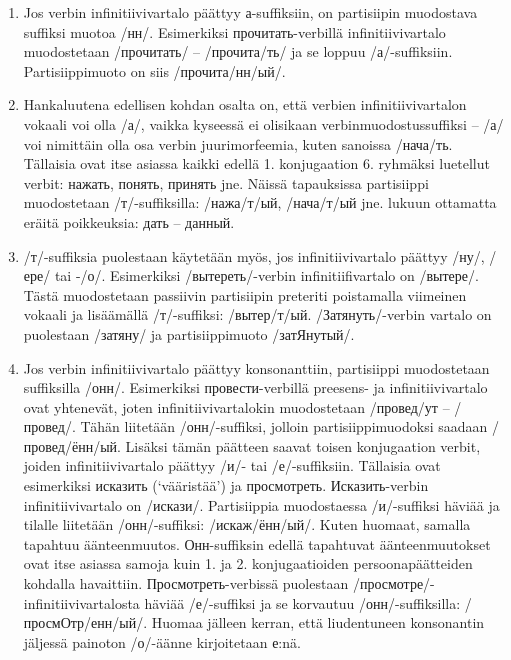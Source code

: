 \documentclass[]{scrreprt}
\providecommand{\tightlist}{%
  \setlength{\itemsep}{0pt}\setlength{\parskip}{0pt}}
\begin{document}
\begin{enumerate}
\def\labelenumi{\arabic{enumi}.}
\tightlist
\item
  Jos verbin infinitiivivartalo päättyy а-suffiksiin, on partisiipin
  muodostava suffiksi muotoa /нн/. Esimerkiksi прочитать-verbillä
  infinitiivivartalo muodostetaan /прочитать/ -- /прочита/ть/ ja se
  loppuu /а/-suffiksiin. Partisiippimuoto on siis /прочита/нн/ый/.
\item
  Hankaluutena edellisen kohdan osalta on, että verbien
  infinitiivivartalon vokaali voi olla /а/, vaikka kyseessä ei olisikaan
  verbinmuodostussuffiksi -- /а/ voi nimittäin olla osa verbin
  juurimorfeemia, kuten sanoissa /нача/ть. Tällaisia ovat itse asiassa
  kaikki edellä 1. konjugaation 6. ryhmäksi luetellut verbit: нажать,
  понять, принять jne. Näissä tapauksissa partisiippi muodostetaan
  /т/-suffiksilla: /нажа/т/ый, /нача/т/ый jne. lukuun ottamatta eräitä
  poikkeuksia: дать -- данный.
\item
  /т/-suffiksia puolestaan käytetään myös, jos infinitiivivartalo
  päättyy /ну/, /ере/ tai -/о/. Esimerkiksi /вытереть/-verbin
  infinitiifivartalo on /вытере/. Tästä muodostetaan passiivin
  partisiipin preteriti poistamalla viimeinen vokaali ja lisäämällä
  /т/-suffiksi: /вытер/т/ый. /Затянуть/-verbin vartalo on puolestaan
  /затяну/ ja partisiippimuoto /затЯнутый/.
\item
  Jos verbin infinitiivivartalo päättyy konsonanttiin, partisiippi
  muodostetaan suffiksilla /онн/. Esimerkiksi провести-verbillä
  preesens- ja infinitiivivartalo ovat yhtenevät, joten
  infinitiivivartalokin muodostetaan /провед/ут -- /провед/. Tähän
  liitetään /онн/-suffiksi, jolloin partisiippimuodoksi saadaan
  /провед/ённ/ый. Lisäksi tämän päätteen saavat toisen konjugaation
  verbit, joiden infinitiivivartalo päättyy /и/- tai /е/-suffiksiin.
  Tällaisia ovat esimerkiksi исказить (`vääristää') ja просмотреть.
  Исказить-verbin infinitiivivartalo on /искази/. Partisiippia
  muodostaessa /и/-suffiksi häviää ja tilalle liitetään /онн/-suffiksi:
  /искаж/ённ/ый/. Kuten huomaat, samalla tapahtuu äänteenmuutos.
  Онн-suffiksin edellä tapahtuvat äänteenmuutokset ovat itse asiassa
  samoja kuin 1. ja 2. konjugaatioiden persoonapäätteiden kohdalla
  havaittiin. Просмотреть-verbissä puolestaan
  /просмотре/-infinitiivivartalosta häviää /е/-suffiksi ja se korvautuu
  /онн/-suffiksilla: /просмОтр/енн/ый/. Huomaa jälleen kerran, että
  liudentuneen konsonantin jäljessä painoton /о/-äänne kirjoitetaan
  е:nä.
\end{enumerate}
\end{document}
